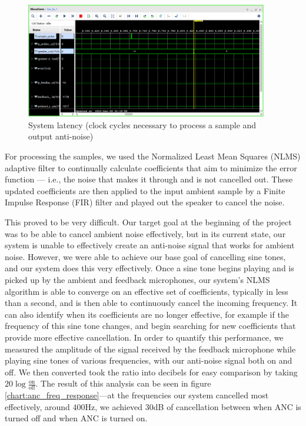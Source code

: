 \documentclass{fpgairpods}
\begin{document}
\begin{figure}
\centering
\includegraphics[width=300pt]{./figs/system_latency_ila.png}
\caption{System latency (clock cycles necessary to process a sample and output anti-noise)}
\label{fig:systemlatency}
\end{figure}

For processing the samples, we used the Normalized Least Mean Squares (NLMS) adaptive filter to continually calculate coefficients that aim to minimize the error function --- i.e., the noise that makes it through and is not cancelled out. These updated coefficients are then applied to the input ambient sample by a Finite Impulse Response (FIR) filter and played out the speaker to cancel the noise. 

This proved to be very difficult. Our target goal at the beginning of the project was to be able to cancel ambient noise effectively, but in its current state, our system is unable to effectively create an anti-noise signal that works for ambient noise. However, we were able to achieve our base goal of cancelling sine tones, and our system does this very effectively. Once a sine tone begins playing and is picked up by the ambient and feedback microphones, our system's NLMS algorithm is able to converge on an effective set of coefficients, typically in less than a second, and is then able to continuously cancel the incoming frequency. It can also identify when its coefficients are no longer effective, for example if the frequency of this sine tone changes, and begin searching for new coefficients that provide more effective cancellation. In order to quantify this performance, we measured the amplitude of the signal received by the feedback microphone while playing sine tones of various frequencies, with our anti-noise signal both on and off. We then converted took the ratio into decibels for easy comparison by taking $20\log{\frac{\text{on}}{\text{off}}}$. The result of this analysis can be seen in figure \ref{chart:anc_freq_response}---at the frequencies our system cancelled most effectively, around 400Hz, we achieved 30dB of cancellation between when ANC is turned off and when ANC is turned on.
\end{document}
